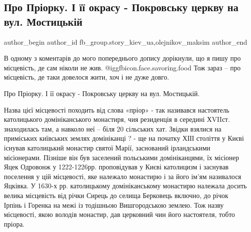  
 
 
 
 
 
\subsection{Про Пріорку. І її окрасу - Покровську церкву на вул. Мостицькій}
\label{sec:05_12_2021.fb.fb_group.story_kiev_ua.1.priorka}
 
\ifcmt
 author_begin
   author_id fb_group.story_kiev_ua,olejnikov_maksim
 author_end
\fi

В одному з коментарів до мого попереднього допису дорікнули, що я пишу про
місцевість, де сам ніколи не жив.  @igg{fbicon.face.savoring.food}  Тож зараз – про місцевість, де таки
довелося жити, хоч і не дуже довго.

Про Пріорку. І її окрасу - Покровську церкву на вул. Мостицькій.  

\begin{multicols}{2}
\end{multicols}

Назва цієї місцевості походить від слова «пріор» - так називався настоятель
католицького домініканського монастиря, чия резиденція в середині ХVIIст.
знаходилась там, а навколо неї – біля 20 сільських хат. Звідки взялися на
приміських київських землях домініканці ? - ще на початку ХІІІ століття у Києві
існував католицький монастир святої Марії, заснований ірландськими місіонерами.
Пізніше він був заселений польськими домініканцями, їх місіонер Яцек Одровонж у
1222-1226рр. проповідував у Києві католицизм і заснував поселення у цій
місцевості, яке належало монастирю і за його ім’ям називалося Яцківка. У 1630-х
рр. католицькому домініканському монастирю належала досить велика місцевість
від річки Сирець до селища Берковець включно, до річок Ірпінь і Горенка на межі
із тодішньою Вишгородською землею. Тож назву місцевості, якою володів монастир,
дав церковний чин його настоятеля, тобто пріора.

